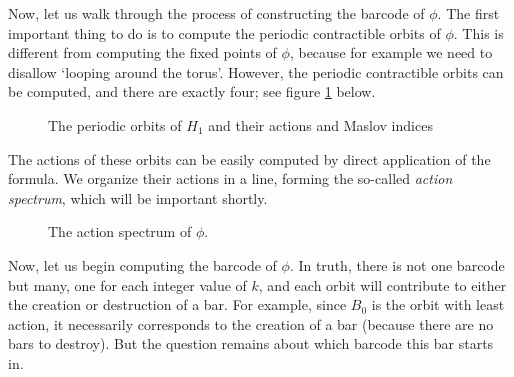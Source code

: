 \documentclass[11pt, a4paper]{article}
\theoremstyle{nonumberplain}
\begin{document}
Now, let us walk through the process of constructing the barcode of $\phi$. The first important thing to do is to compute the periodic contractible orbits of $\phi$. This is different from computing the fixed points of $\phi$, because for example we need to disallow `looping around the torus'. However, the periodic contractible orbits can be computed, and there are exactly four; see figure \ref{fig:po1} below.
\begin{figure}[H]
\centering
{}
\caption{The periodic orbits of $H_1$ and their actions and Maslov indices}
\label{fig:po1}
\end{figure}

The actions of these orbits can be easily computed by direct application of the formula. We organize their actions in a line, forming the so-called \emph{action spectrum}, which will be important shortly.

\begin{figure}[H]
\centering
{}
\caption{The action spectrum of $\phi$.}
\end{figure}

Now, let us begin computing the barcode of $\phi$. In truth, there is not one barcode but many, one for each integer value of $k$, and each orbit will contribute to either the creation or destruction of a bar. For example, since $B_0$ is the orbit with least action, it necessarily corresponds to the creation of a bar (because there are no bars to destroy). But the question remains about which barcode this bar starts in.
\end{document}
